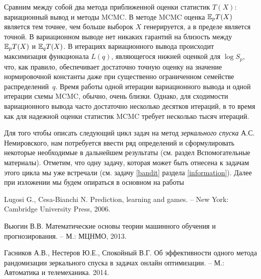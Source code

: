 \begin{remark}
Сравним между собой два метода приближенной оценки статистик $T(X)$: вариационный вывод и методы MCMC. В методе MCMC оценка $\mathrm{{\mathbb E}}_p T(X)$ является тем точнее, чем больше выборок $X$ генерируется, а в пределе является точной. В вариационном выводе нет никаких гарантий на близость между $\mathrm{{\mathbb E}}_p T(X)$ и $\mathrm{{\mathbb E}}_q T(X)$. В итерациях вариационного вывода происходит максимизация функционала $L(q)$, являющегося нижней оценкой для  $\log S_p$, что, как правило,  обеспечивает достаточно точную оценку на значение нормировочной константы даже при существенно ограниченном семействе распределений~$q$. Время работы одной итерации вариационного вывода и одной итерации схемы MCMC, обычно, очень близки. Однако, для сходимости вариационного вывода часто достаточно несколько десятков итераций, в то время как для надежной оценки статистик MCMC требует несколько тысяч итераций.
\end{remark}





Для того чтобы описать следующий цикл задач на метод \textit{зеркального спуска} 
А.С. Немировского, нам потребуется ввести ряд определений и сформулировать 
некоторые необходимые в дальнейшем результаты (см. раздел Вспомогательные материалы). Отметим, что одну задачу, 
которая может быть отнесена к задачам этого цикла мы уже встречали (см. 
задачу \ref{bandit} раздела \ref{information}).  Далее при изложении мы будем опираться в основном на работы

Lugosi G., Cesa-Bianchi N. Prediction, learning and games. -- New York: Cambridge University Press, 2006.

Вьюгин В.В. Математические основы теории машинного обучения и прогнозирования. -- М.: МЦНМО, 2013.


Гасников А.В., Нестеров Ю.Е., Спокойный В.Г. Об эффективности одного метода рандомизации зеркального спуска в задачах онлайн оптимизации. -- М.: Автоматика и телемеханика. 2014.



